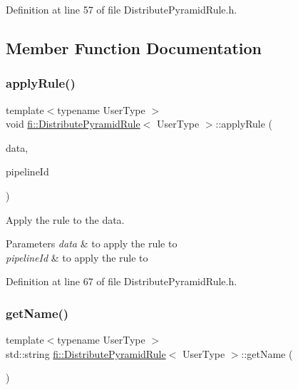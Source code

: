 Definition at line 57 of file Distribute\+Pyramid\+Rule.\+h.



\subsection{Member Function Documentation}
\mbox{\label{classfi_1_1DistributePyramidRule_a4daacbcfcf56eb5b888112b9e99df9da}} 
\subsubsection{\texorpdfstring{apply\+Rule()}{applyRule()}}
{\footnotesize\ttfamily template$<$typename User\+Type $>$ \\
void \hyperlink{classfi_1_1DistributePyramidRule}{fi\+::\+Distribute\+Pyramid\+Rule}$<$ User\+Type $>$\+::apply\+Rule (\begin{DoxyParamCaption}\item[{std\+::shared\+\_\+ptr$<$ \hyperlink{classfi_1_1HTGSViewRequestData}{fi\+::\+H\+T\+G\+S\+View\+Request\+Data}$<$ User\+Type $>$$>$}]{data,  }\item[{size\+\_\+t}]{pipeline\+Id }\end{DoxyParamCaption})\hspace{0.3cm}{\ttfamily [inline]}}



Apply the rule to the data. 


\begin{DoxyParams}{Parameters}
{\em data} & to apply the rule to \\
\hline
{\em pipeline\+Id} & to apply the rule to \\
\hline
\end{DoxyParams}


Definition at line 67 of file Distribute\+Pyramid\+Rule.\+h.

\mbox{\label{classfi_1_1DistributePyramidRule_ad46de4eaa09ac041d05c09ddd6935ece}} 
\subsubsection{\texorpdfstring{get\+Name()}{getName()}}
{\footnotesize\ttfamily template$<$typename User\+Type $>$ \\
std\+::string \hyperlink{classfi_1_1DistributePyramidRule}{fi\+::\+Distribute\+Pyramid\+Rule}$<$ User\+Type $>$\+::get\+Name (\begin{DoxyParamCaption}{ }\end{DoxyParamCaption})\hspace{0.3cm}{\ttfamily [inline]}}



